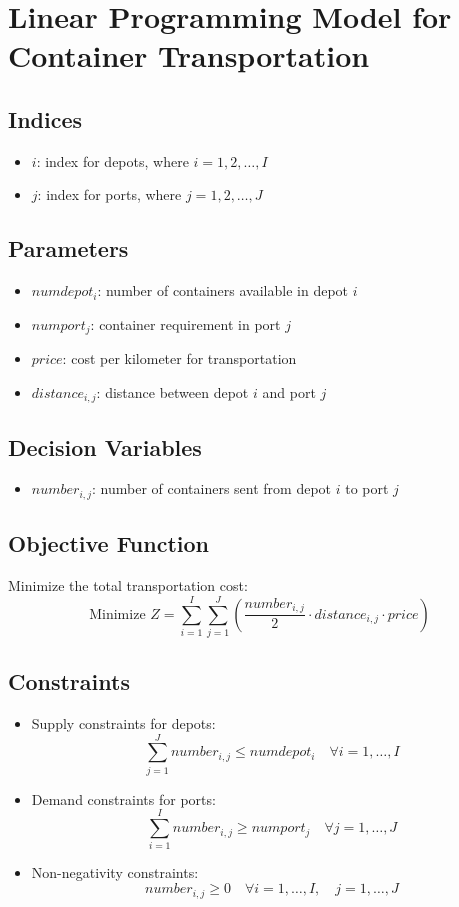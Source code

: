 \documentclass{article}
\begin{document}
\section*{Linear Programming Model for Container Transportation}

\subsection*{Indices}
\begin{itemize}
    \item $i$: index for depots, where $i = 1, 2, \ldots, I$
    \item $j$: index for ports, where $j = 1, 2, \ldots, J$
\end{itemize}

\subsection*{Parameters}
\begin{itemize}
    \item $numdepot_i$: number of containers available in depot $i$
    \item $numport_j$: container requirement in port $j$
    \item $price$: cost per kilometer for transportation
    \item $distance_{i,j}$: distance between depot $i$ and port $j$
\end{itemize}

\subsection*{Decision Variables}
\begin{itemize}
    \item $number_{i,j}$: number of containers sent from depot $i$ to port $j$
\end{itemize}

\subsection*{Objective Function}
Minimize the total transportation cost:
\[
\text{Minimize } Z = \sum_{i=1}^{I} \sum_{j=1}^{J} \left( \frac{number_{i,j}}{2} \cdot distance_{i,j} \cdot price \right)
\]

\subsection*{Constraints}
\begin{itemize}
    \item Supply constraints for depots:
    \[
    \sum_{j=1}^{J} number_{i,j} \leq numdepot_i \quad \forall i = 1, \ldots, I
    \]

    \item Demand constraints for ports:
    \[
    \sum_{i=1}^{I} number_{i,j} \geq numport_j \quad \forall j = 1, \ldots, J
    \]

    \item Non-negativity constraints:
    \[
    number_{i,j} \geq 0 \quad \forall i = 1, \ldots, I, \quad j = 1, \ldots, J
    \]
\end{itemize}
\end{document}
